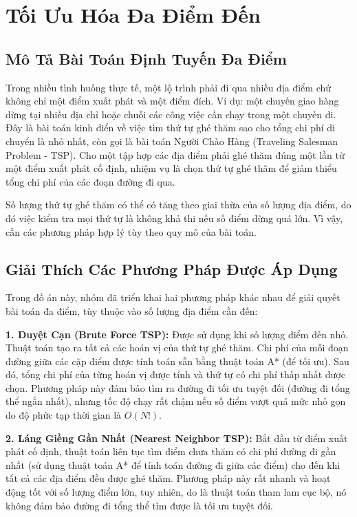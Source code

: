 \chapter{Tối Ưu Hóa Đa Điểm Đến}
\label{chap:multilocation}

\section{Mô Tả Bài Toán Định Tuyến Đa Điểm}

Trong nhiều tình huống thực tế, một lộ trình phải đi qua nhiều địa điểm chứ không chỉ một điểm xuất phát và một điểm đích. Ví dụ: một chuyến giao hàng dừng tại nhiều địa chỉ hoặc chuỗi các công việc cần chạy trong một chuyến đi. Đây là bài toán kinh điển về việc tìm thứ tự ghé thăm sao cho tổng chi phí di chuyển là nhỏ nhất, còn gọi là bài toán Người Chào Hàng (Traveling Salesman Problem - TSP). Cho một tập hợp các địa điểm phải ghé thăm đúng một lần từ một điểm xuất phát cố định, nhiệm vụ là chọn thứ tự ghé thăm để giảm thiểu tổng chi phí của các đoạn đường đi qua.

Số lượng thứ tự ghé thăm có thể có tăng theo giai thừa của số lượng địa điểm, do đó việc kiểm tra mọi thứ tự là không khả thi nếu số điểm dừng quá lớn. Vì vậy, cần các phương pháp hợp lý tùy theo quy mô của bài toán.

\section{Giải Thích Các Phương Pháp Được Áp Dụng}

Trong đồ án này, nhóm đã triển khai hai phương pháp khác nhau để giải quyết bài toán đa điểm, tùy thuộc vào số lượng địa điểm cần đến:

\textbf{1. Duyệt Cạn (Brute Force TSP):} Được sử dụng khi số lượng điểm đến nhỏ. Thuật toán tạo ra tất cả các hoán vị của thứ tự ghé thăm. Chi phí của mỗi đoạn đường giữa các cặp điểm được tính toán sẵn bằng thuật toán A* (để tối ưu). Sau đó, tổng chi phí của từng hoán vị được tính và thứ tự có chi phí thấp nhất được chọn. Phương pháp này đảm bảo tìm ra đường đi tối ưu tuyệt đối (đường đi tổng thể ngắn nhất), nhưng tốc độ chạy rất chậm nếu số điểm vượt quá mức nhỏ gọn do độ phức tạp thời gian là $O(N!)$.

\textbf{2. Láng Giềng Gần Nhất (Nearest Neighbor TSP):} Bắt đầu từ điểm xuất phát cố định, thuật toán liên tục tìm điểm chưa thăm có chi phí đường đi gần nhất (sử dụng thuật toán A* để tính toán đường đi giữa các điểm) cho đến khi tất cả các địa điểm đều được ghé thăm. Phương pháp này rất nhanh và hoạt động tốt với số lượng điểm lớn, tuy nhiên, do là thuật toán tham lam cục bộ, nó không đảm bảo đường đi tổng thể tìm được là tối ưu tuyệt đối.

